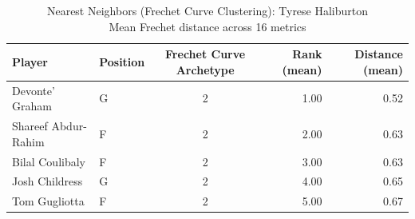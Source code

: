 \begin{table}[t]
\caption*{
{\fontsize{20}{25} Nearest Neighbors (Frechet Curve Clustering): Tyrese Haliburton\fontsize{12}{15}\selectfont } \\ 
{\fontsize{14}{17}\selectfont  Mean Frechet distance across 16 metrics\fontsize{12}{15}\selectfont }
} 
\fontsize{12.0pt}{14.0pt}\selectfont
\begin{tabular*}{\linewidth}{@{\extracolsep{\fill}}llcrr}
\toprule
Player & Position & Frechet Curve Archetype & Rank (mean) & Distance (mean) \\ 
\midrule\addlinespace[2.5pt]
Devonte' Graham & G & 2 & 1.00 & 0.52 \\ 
Shareef Abdur-Rahim & F & 2 & 2.00 & 0.63 \\ 
Bilal Coulibaly & F & 2 & 3.00 & 0.63 \\ 
Josh Childress & G & 2 & 4.00 & 0.65 \\ 
Tom Gugliotta & F & 2 & 5.00 & 0.67 \\ 
\bottomrule
\end{tabular*}
\end{table}

